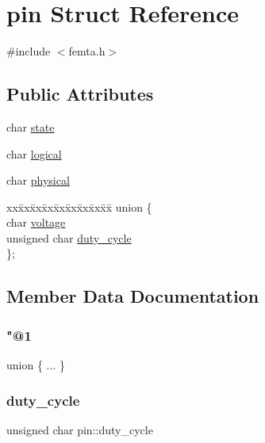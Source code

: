 \hypertarget{structpin}{}\section{pin Struct Reference}
\label{structpin}


{\ttfamily \#include $<$femta.\+h$>$}

\subsection*{Public Attributes}
\begin{DoxyCompactItemize}
\item 
char \hyperlink{structpin_a59c3020dc417fbda00ae4926db264a51}{state}
\item 
char \hyperlink{structpin_a5904e86c433f331ce55ed3ead575a802}{logical}
\item 
char \hyperlink{structpin_a0d3051114699672c833f272c06f2c658}{physical}
\item 
\begin{tabbing}
xx\=xx\=xx\=xx\=xx\=xx\=xx\=xx\=xx\=\kill
union \{\\
\>char \hyperlink{structpin_a11d53a2f512e95511a962537d333d9b5}{voltage}\\
\>unsigned char \hyperlink{structpin_a146ea977cbe36e19bd786615467a6106}{duty\_cycle}\\
\}; \\

\end{tabbing}\end{DoxyCompactItemize}


\subsection{Member Data Documentation}
\mbox{\label{structpin_a5afcad2d92d6a6b92e9c58c02bdf8ce8}} 
\subsubsection{\texorpdfstring{"@1}{@1}}
{\footnotesize\ttfamily union \{ ... \} }

\mbox{\label{structpin_a146ea977cbe36e19bd786615467a6106}} 
\subsubsection{\texorpdfstring{duty\+\_\+cycle}{duty\_cycle}}
{\footnotesize\ttfamily unsigned char pin\+::duty\+\_\+cycle}

